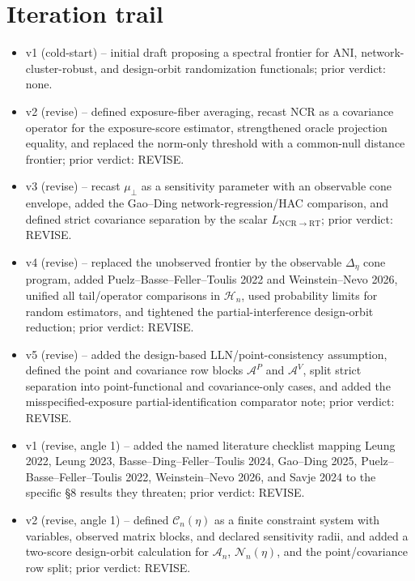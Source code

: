 \documentclass[11pt]{article}
\theoremstyle{definition}
\theoremstyle{plain}
\theoremstyle{remark}
\begin{document}
\section{Iteration trail}
\begin{itemize}[leftmargin=*]
\item v1 (cold-start) -- initial draft proposing a spectral frontier for
ANI, network-cluster-robust, and design-orbit randomization functionals; prior
verdict: none.
\item v2 (revise) -- defined exposure-fiber averaging, recast NCR as a
covariance operator for the exposure-score estimator, strengthened oracle
projection equality, and replaced the norm-only threshold with a common-null
distance frontier; prior verdict: REVISE.
\item v3 (revise) -- recast \(\mu_{\perp}\) as a sensitivity parameter with an
observable cone envelope, added the Gao--Ding network-regression/HAC comparison,
and defined strict covariance separation by the scalar
\(L_{\mathrm{NCR}\to\mathrm{RT}}\); prior verdict: REVISE.
\item v4 (revise) -- replaced the unobserved frontier by the observable
\(\Delta_\eta\) cone program, added Puelz--Basse--Feller--Toulis 2022 and
Weinstein--Nevo 2026, unified all tail/operator comparisons in
\(\mathcal H_n\), used probability limits for random estimators, and tightened
the partial-interference design-orbit reduction; prior verdict: REVISE.
\item v5 (revise) -- added the design-based LLN/point-consistency assumption,
defined the point and covariance row blocks \(\mathcal A^P\) and
\(\mathcal A^V\), split strict separation into point-functional and
covariance-only cases, and added the misspecified-exposure
partial-identification comparator note; prior verdict: REVISE.
\item v1 (revise, angle 1) -- added the named literature checklist mapping
Leung 2022, Leung 2023, Basse--Ding--Feller--Toulis 2024, Gao--Ding 2025,
Puelz--Basse--Feller--Toulis 2022, Weinstein--Nevo 2026, and Savje 2024 to the
specific \S8 results they threaten; prior verdict: REVISE.
\item v2 (revise, angle 1) -- defined \(\mathcal C_n(\eta)\) as a finite
constraint system with variables, observed matrix blocks, and declared
sensitivity radii, and added a two-score design-orbit calculation for
\(\mathcal A_n\), \(\mathcal N_n(\eta)\), and the point/covariance row split;
prior verdict: REVISE.
\end{itemize}
\end{document}
